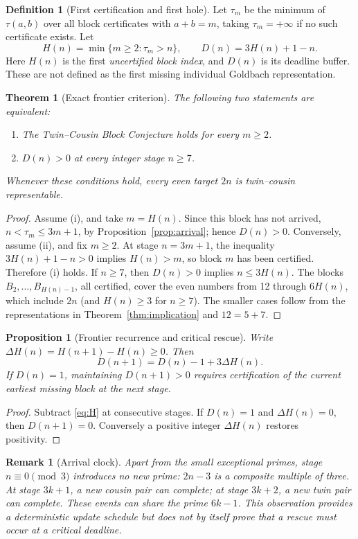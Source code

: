\documentclass[11pt,a4paper]{article}
\numberwithin{equation}{section}
\newtheorem{theorem}[conjecture]{Theorem}
\newtheorem{proposition}[conjecture]{Proposition}
\newtheorem{remark}[conjecture]{Remark}
\theoremstyle{definition}
\newtheorem{definition}[conjecture]{Definition}
\begin{document}
\begin{definition}[First certification and first hole]
Let \(\tau_m\) be the minimum of \(\tau(a,b)\) over all block certificates with \(a+b=m\), taking \(\tau_m=+\infty\) if no such certificate exists. Let
\begin{equation}\label{eq:H}
H(n)=\min\{m\ge2:\tau_m>n\},\qquad D(n)=3H(n)+1-n.
\end{equation}
Here \(H(n)\) is the first \emph{uncertified block index}, and \(D(n)\) is its deadline buffer. These are not defined as the first missing individual Goldbach representation.
\end{definition}
\begin{theorem}[Exact frontier criterion]\label{thm:frontier}
The following two statements are equivalent:
\begin{enumerate}[label=\textup{(\roman*)},leftmargin=22pt]
\item The Twin--Cousin Block Conjecture holds for every \(m\ge2\).
\item \(D(n)>0\) at every integer stage \(n\ge7\).
\end{enumerate}
Whenever these conditions hold, every even target \(2n\) is twin--cousin representable.
\end{theorem}
\begin{proof}
Assume (i), and take \(m=H(n)\). Since this block has not arrived, \(n<\tau_m\le3m+1\), by Proposition~\ref{prop:arrival}; hence \(D(n)>0\).
Conversely, assume (ii), and fix \(m\ge2\). At stage \(n=3m+1\), the inequality \(3H(n)+1-n>0\) implies \(H(n)>m\), so block \(m\) has been certified. Therefore (i) holds.
If \(n\ge7\), then \(D(n)>0\) implies \(n\le3H(n)\). The blocks \(B_2,\ldots,B_{H(n)-1}\), all certified, cover the even numbers from 12 through \(6H(n)\), which include \(2n\) (and \(H(n)\ge3\) for \(n\ge7\)). The smaller cases follow from the representations in Theorem~\ref{thm:implication} and \(12=5+7\).
\end{proof}
\begin{proposition}[Frontier recurrence and critical rescue]\label{prop:recurrence}
Write \(\Delta H(n)=H(n+1)-H(n)\ge0\). Then
\begin{equation}\label{eq:recurrence}
D(n+1)=D(n)-1+3\Delta H(n).
\end{equation}
If \(D(n)=1\), maintaining \(D(n+1)>0\) requires certification of the current earliest missing block at the next stage.
\end{proposition}
\begin{proof}
Subtract \eqref{eq:H} at consecutive stages. If \(D(n)=1\) and \(\Delta H(n)=0\), then \(D(n+1)=0\). Conversely a positive integer \(\Delta H(n)\) restores positivity.
\end{proof}
\begin{remark}[Arrival clock]
Apart from the small exceptional primes, stage \(n\equiv0\pmod3\) introduces no new prime: \(2n-3\) is a composite multiple of three. At stage \(3k+1\), a new cousin pair can complete; at stage \(3k+2\), a new twin pair can complete. These events can share the prime \(6k-1\). This observation provides a deterministic update schedule but does \emph{not} by itself prove that a rescue must occur at a critical deadline.
\end{remark}
\end{document}
